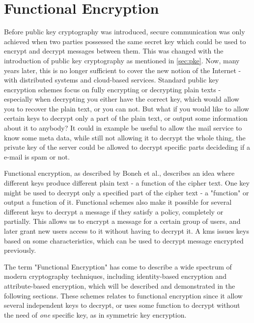 \section{Functional Encryption}
Before public key cryptography was introduced, secure communication was only achieved when two parties possessed the same secret key which could be used to encrypt and decrypt messages between them. This was changed with the introduction of public key cryptography as mentioned in \ref{sec:pke}. Now, many years later, this is no longer sufficient to cover the new notion of the Internet - with distributed systems and cloud-based services. Standard public key encryption schemes focus on fully encrypting or decrypting plain texts - especially when decrypting you either have the correct key, which would allow you to recover the plain text, or you can not. But what if you would like to allow certain keys to decrypt only a part of the plain text, or output some information about it to anybody? It could in example be useful to allow the mail service to know some meta data, while still not allowing it to decrypt the whole thing, the private key of the server could be allowed to decrypt specific parts decideding if a e-mail is spam or not.
\par Functional encryption, as described by Boneh et al.\cite{boneh2012functional}, describes an idea where different keys produce different plain text - a function of the cipher text. One key might be used to decrypt only a specified part of the cipher text - a "function" or output a function of it. Functional schemes also make it possible for several different keys to decrypt a message if they satisfy a policy, completely or partially. This allows us to encrypt a message for a certain group of users, and later grant new users access to it without having to decrypt it. A \gls{kms} issues keys based on some characteristics, which can be used to decrypt message encrypted previously. 
\par The term "Functional Encryption" has come to describe a wide spectrum of modern cryptography techniques, including identity-based encryption and attribute-based encryption, which will be described and demonstrated in the following sections. These schemes relates to functional encryption since it allow several independent keys to decrypt, or uses some function to decrypt without the need of \emph{one} specific key, as in symmetric key encryption.



